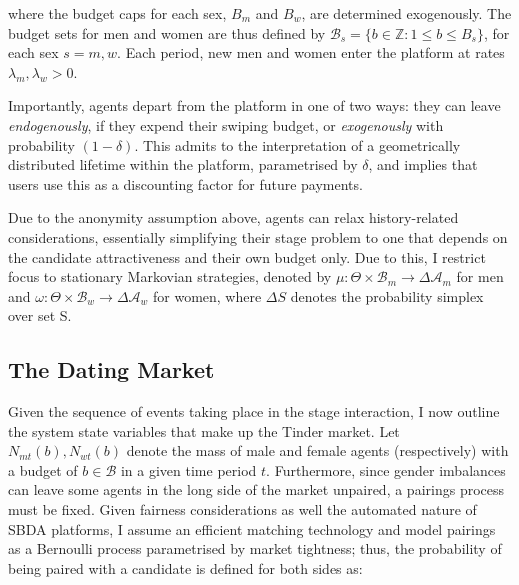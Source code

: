 where the budget caps for each sex, $B_m$ and $B_w$, are determined exogenously. The budget sets for men and women are thus defined by $\mathcal{B}_{s}=\{b \in \mathbb{Z} : 1\leq b \leq B_s\}$, for each sex $s=m,w$. Each period, new men and women enter the platform at rates $\lambda_m, \lambda_w>0$.
\begin{comment}
    , with their attractiveness drawn i.i.d from distributions with cumulative distribution functions $F_m$ and $F_w$, respectively
\end{comment}
Importantly, agents depart from the platform in one of two ways: they can leave \textit{endogenously}, if they expend their swiping budget, or \textit{exogenously} with probability $(1-\delta)$. This admits to the interpretation of a geometrically distributed lifetime within the platform, parametrised by $\delta$, and implies that users use this as a discounting factor for future payments.

Due to the anonymity assumption above, agents can relax history-related considerations, essentially simplifying their stage problem to one that depends on the candidate attractiveness and their own budget only. Due to this, I restrict focus to stationary Markovian strategies, denoted by $\mu: \Theta \times\mathcal{B}_m\rightarrow \Delta\mathcal{A}_m$ for men and $\omega:\Theta \times\mathcal{B}_w\rightarrow \Delta\mathcal{A}_w$ for women, where $\Delta S$ denotes the probability simplex over set S. 

\subsection{The Dating Market}\label{sec:section2.2}
Given the sequence of events taking place in the stage interaction, I now outline the system state variables that make up the Tinder market. Let $N_{mt}(b), N_{wt}(b)$ denote the mass of male and female agents (respectively) with a budget of $b\in\mathcal{B}$ in a given time period $t$. Furthermore, since gender imbalances can leave some agents in the long side of the market unpaired, a pairings process must be fixed. Given fairness considerations as well the automated nature of SBDA platforms, I assume an efficient matching technology and model pairings as a Bernoulli process parametrised by market tightness; thus, the probability of being paired with a candidate is defined for both sides as:


